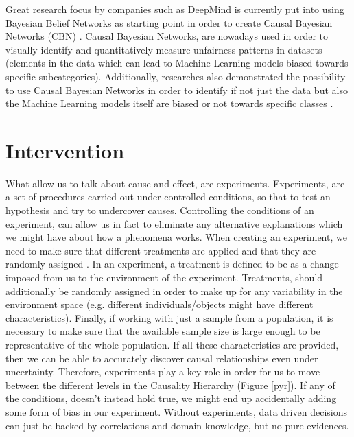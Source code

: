 Great research focus by companies such as DeepMind is currently put into using Bayesian Belief Networks as starting point in order to create Causal Bayesian Networks (CBN) \cite{deep}. Causal Bayesian Networks, are nowadays used in order to visually identify and quantitatively measure unfairness patterns in datasets (elements in the data which can lead to Machine Learning models biased towards specific subcategories). Additionally, researches also demonstrated the possibility to use Causal Bayesian Networks in order to identify if not just the data but also the Machine Learning models itself are biased or not towards specific classes \cite{deep2}.

\section{Intervention}
What allow us to talk about cause and effect, are experiments. Experiments, are a set of procedures carried out under controlled conditions, so that to test an hypothesis and try to undercover causes. Controlling the conditions of an experiment, can allow us in fact to eliminate any alternative explanations which we might have about how a phenomena works. When creating an experiment, we need to make sure that different treatments are applied and that they are randomly assigned \cite{cassie}. In an experiment, a treatment is defined to be as a change imposed from us to the environment of the experiment. Treatments, should additionally be randomly assigned in order to make up for any variability in the environment space (e.g. different individuals/objects might have different characteristics). Finally, if working with just a sample from a population, it is necessary to make sure that the available sample size is large enough to be representative of the whole population. If all these characteristics are provided, then we can be able to accurately discover causal relationships even under uncertainty. Therefore, experiments play a key role in order for us to move between the different levels in the Causality Hierarchy (Figure \ref{pyr}). If any of the conditions, doesn't instead hold true, we might end up accidentally adding some form of bias in our experiment. Without experiments, data driven decisions can just be backed by correlations and domain knowledge, but no pure evidences.

